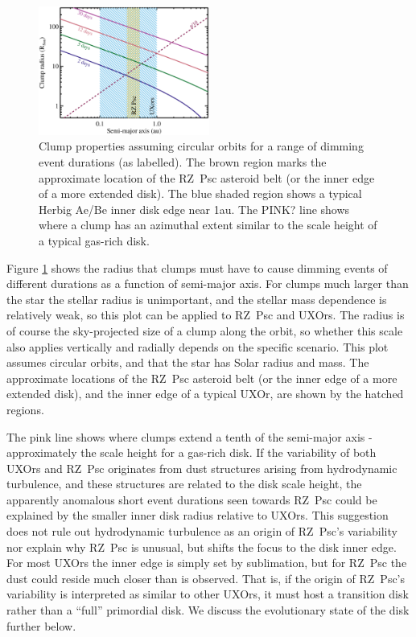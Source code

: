 \documentclass[useAMS,usenatbib,usegraphicx]{mn2e}
\begin{document}
\begin{figure}
  \begin{center}
    \hspace{-0.5cm} \includegraphics[width=0.5\textwidth]{figs/rcl-a.eps}
    \caption{Clump properties assuming circular orbits for a range of dimming event
      durations (as labelled). The brown region marks the approximate location of the
      RZ~Psc asteroid belt (or the inner edge of a more extended disk). The blue shaded
      region shows a typical Herbig Ae/Be inner disk edge near 1au. The PINK? line shows
      where a clump has an azimuthal extent similar to the scale height of a typical
      gas-rich disk.}\label{fig:rcla}
  \end{center}
\end{figure}

Figure \ref{fig:rcla} shows the radius that clumps must have to cause dimming events of
different durations as a function of semi-major axis. For clumps much larger than the
star the stellar radius is unimportant, and the stellar mass dependence is relatively
weak, so this plot can be applied to RZ~Psc and UXOrs. The radius is of course the
sky-projected size of a clump along the orbit, so whether this scale also applies
vertically and radially depends on the specific scenario. This plot assumes circular
orbits, and that the star has Solar radius and mass. The approximate locations of the
RZ~Psc asteroid belt (or the inner edge of a more extended disk), and the inner edge of a
typical UXOr, are shown by the hatched regions.

The pink line shows where clumps extend a tenth of the semi-major axis - approximately
the scale height for a gas-rich disk. If the variability of both UXOrs and RZ~Psc
originates from dust structures arising from hydrodynamic turbulence, and these
structures are related to the disk scale height, the apparently anomalous short event
durations seen towards RZ~Psc could be explained by the smaller inner disk radius
relative to UXOrs. This suggestion does not rule out hydrodynamic turbulence as an origin
of RZ~Psc's variability nor explain why RZ~Psc is unusual, but shifts the focus to the
disk inner edge. For most UXOrs the inner edge is simply set by sublimation, but for
RZ~Psc the dust could reside much closer than is observed. That is, if the origin of
RZ~Psc's variability is interpreted as similar to other UXOrs, it must host a transition
disk rather than a ``full'' primordial disk. We discuss the evolutionary state of the
disk further below.
\end{document}

